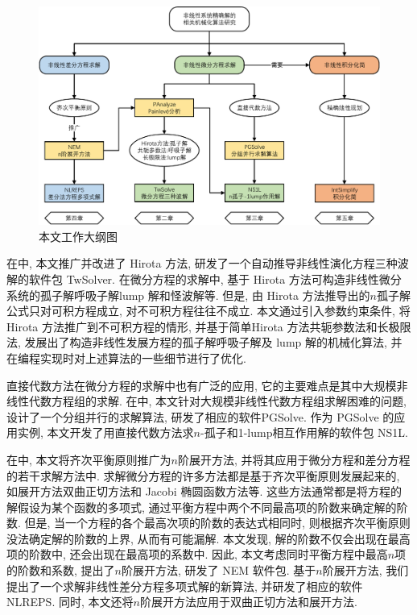 \begin{figure}[htbp]
\includegraphics[width=\textwidth]{fig/outline.pdf}
\caption{本文工作大纲图}\label{outline}
\end{figure}

在中, 本文推广并改进了 Hirota 方法, 研发了一个自动推导非线性演化方程三种波解的软件包 TwSolver. 在微分方程的求解中, 基于 Hirota 方法可构造非线性微分系统的孤子解\D 呼吸子解\D lump 解和怪波解等. 但是, 由 Hirota 方法推导出的$n$孤子解公式只对可积方程成立, 对不可积方程往往不成立. 本文通过引入参数约束条件, 将 Hirota 方法推广到不可积方程的情形, 并基于简单Hirota 方法\D 共轭参数法和长极限法, 发展出了构造非线性发展方程的孤子解\D 呼吸子解及 lump 解的机械化算法, 并在编程实现时对上述算法的一些细节进行了优化. 

直接代数方法在微分方程的求解中也有广泛的应用, 它的主要难点是其中大规模非线性代数方程组的求解. 在中, 本文针对大规模非线性代数方程组求解困难的问题, 设计了一个分组并行的求解算法, 研发了相应的软件PGSolve. 作为 PGSolve 的应用实例, 本文开发了用直接代数方法求$n$-孤子和1-lump相互作用解的软件包 NS1L. 

在中, 本文将齐次平衡原则推广为$n$阶展开方法, 并将其应用于微分方程和差分方程的若干求解方法中. 求解微分方程的许多方法都是基于齐次平衡原则发展起来的, 如\Painleve{}展开方法\D 双曲正切方法和 Jacobi 椭圆函数方法等. 这些方法通常都是将方程的解假设为某个函数的多项式, 通过平衡方程中两个不同最高项的阶数来确定解的阶数. 但是, 当一个方程的各个最高次项的阶数的表达式相同时, 则根据齐次平衡原则没法确定解的阶数的上界, 从而有可能漏解. 本文发现, 解的阶数不仅会出现在最高项的阶数中, 还会出现在最高项的系数中. 因此, 本文考虑同时平衡方程中最高$n$项的阶数和系数, 提出了$n$阶展开方法, 研发了 NEM 软件包. 基于$n$阶展开方法, 我们提出了一个求解非线性差分方程多项式解的新算法, 并研发了相应的软件 NLREPS. 同时, 本文还将$n$阶展开方法应用于双曲正切方法和\Painleve{}展开方法. 

